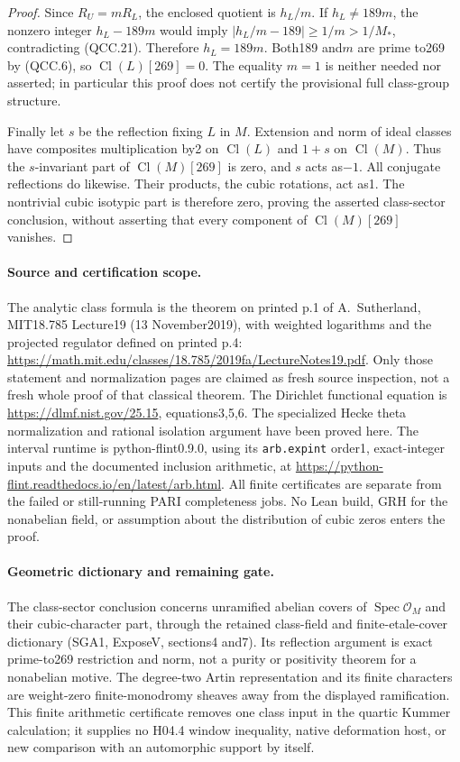 \begin{proof}
Since $R_U=mR_L$, the enclosed quotient is $h_L/m$.
If $h_L\ne189m$, the nonzero integer $h_L-189m$ would imply
$|h_L/m-189|\ge1/m>1/M_*$, contradicting (QCC.21).
Therefore $h_L=189m$.  Both189 and$m$ are prime to269 by (QCC.6),
so $\operatorname{Cl}(L)[269]=0$.  The equality $m=1$ is neither
needed nor asserted; in particular this proof does not certify the
provisional full class-group structure.

Finally let $s$ be the reflection fixing $L$ in $M$.  Extension and
norm of ideal classes have composites multiplication by2 on
$\operatorname{Cl}(L)$ and $1+s$ on $\operatorname{Cl}(M)$.
Thus the $s$-invariant part of $\operatorname{Cl}(M)[269]$ is zero,
and $s$ acts as$-1$.  All conjugate reflections do likewise.
Their products, the cubic rotations, act as1.  The nontrivial cubic
isotypic part is therefore zero, proving the asserted class-sector
conclusion, without asserting that every component of
$\operatorname{Cl}(M)[269]$ vanishes.
\end{proof}

\paragraph{Source and certification scope.}
The analytic class formula is the theorem on printed p.1 of
A.~Sutherland, MIT18.785 Lecture19 (13 November2019), with weighted
logarithms and the projected regulator defined on printed p.4:
\url{https://math.mit.edu/classes/18.785/2019fa/LectureNotes19.pdf}.
Only those statement and normalization pages are claimed as fresh
source inspection, not a fresh whole proof of that classical theorem.
The Dirichlet functional equation is
\url{https://dlmf.nist.gov/25.15}, equations3,5,6.  The specialized
Hecke theta normalization and rational isolation argument have been
proved here.  The interval runtime is python-flint0.9.0, using its
\texttt{arb.expint} order1, exact-integer inputs and the documented
inclusion arithmetic, at
\url{https://python-flint.readthedocs.io/en/latest/arb.html}.
All finite certificates are separate from the failed or still-running
PARI completeness jobs.  No Lean build, GRH for the nonabelian field,
or assumption about the distribution of cubic zeros enters the proof.

\paragraph{Geometric dictionary and remaining gate.}
The class-sector conclusion concerns unramified abelian covers of
$\operatorname{Spec}\mathcal O_M$ and their cubic-character part,
through the retained class-field and finite-etale-cover dictionary
(SGA1, ExposeV, sections4 and7).  Its reflection argument is exact
prime-to269 restriction and norm, not a purity or positivity theorem
for a nonabelian motive.  The degree-two Artin representation and its
finite characters are weight-zero finite-monodromy sheaves away from
the displayed ramification.  This finite arithmetic certificate
removes one class input in the quartic Kummer calculation; it supplies
no H04.4 window inequality, native deformation host, or new comparison
with an automorphic support by itself.
